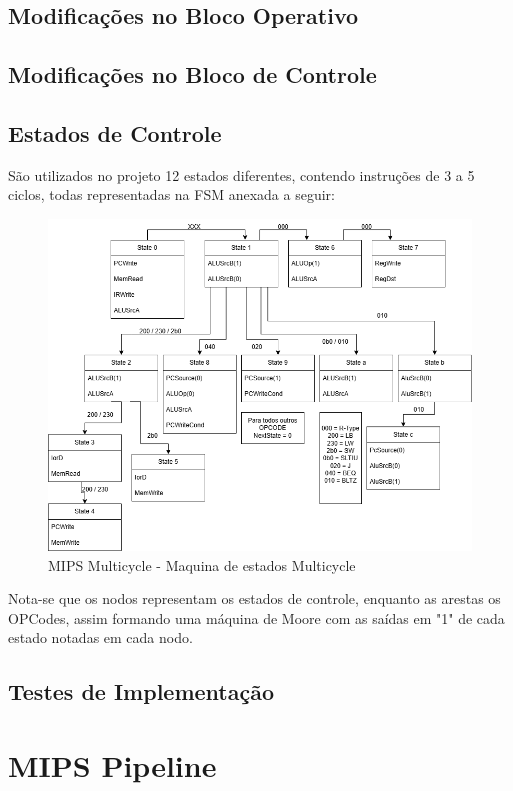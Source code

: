\documentclass{report}
\let\oldsection\section
\renewcommand\section{\clearpage\oldsection}
\begin{document}
        \subsection{Modificações no Bloco Operativo}
        \subsection{Modificações no Bloco de Controle}
        \subsection{Estados de Controle}
        São utilizados no projeto 12 estados diferentes, contendo instruções de 3 a 5 ciclos, todas representadas na FSM anexada a seguir:
        \begin{figure}[h!]
            \centering
            \includegraphics[width=\linewidth]{images/prints/Multicycle/FSM Multicycle.png}
            \caption{\label{print:FSM_Multicycle} MIPS Multicycle - Maquina de estados Multicycle}
        \end{figure}
        Nota-se que os nodos representam os estados de controle, enquanto as arestas os OPCodes, assim formando uma máquina de Moore com as saídas em "1" de cada estado notadas em cada nodo.

        \subsection{Testes de Implementação}

    \section{MIPS Pipeline}
\end{document}

